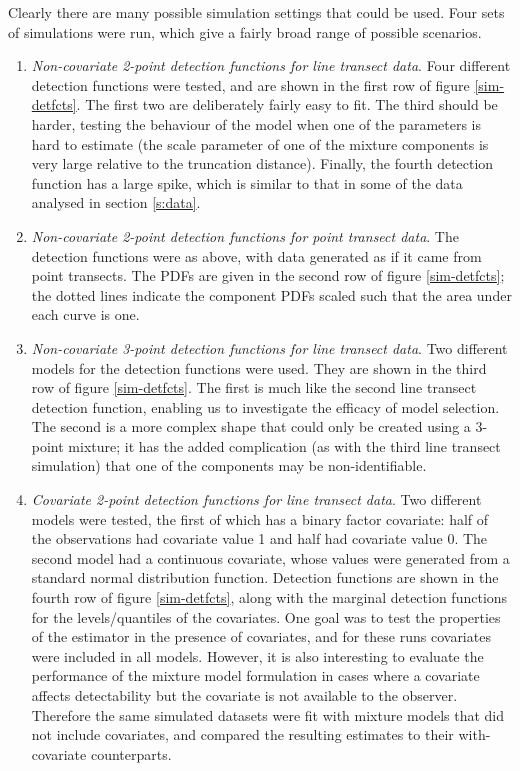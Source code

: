 Clearly there are many possible simulation settings that could be used. Four sets of simulations were run, which give a fairly broad range of possible scenarios.
\begin{enumerate}
	\item \textit{Non-covariate 2-point detection functions for line transect data}. Four different detection functions were tested, and are shown in the first row of figure \ref{sim-detfcts}. The first two are deliberately fairly easy to fit. The third should be harder, testing the behaviour of the model when one of the parameters is hard to estimate (the scale parameter of one of the mixture components is very large relative to the truncation distance). Finally, the fourth detection function has a large spike, which is similar to that in some of the data analysed in section \ref{s:data}.
	\item \textit{Non-covariate 2-point detection functions for point transect data}.  The detection functions were as above, with data generated as if it came from point transects. The PDFs are given in the second row of figure \ref{sim-detfcts}; the dotted lines indicate the component PDFs scaled such that the area under each curve is one.
	\item \textit{Non-covariate 3-point detection functions for line transect data}. Two different models for the detection functions were used. They are shown in the third row of figure \ref{sim-detfcts}. The first is much like the second line transect detection function, enabling us to investigate the efficacy of model selection. The second is a more complex shape that could only be created using a 3-point mixture; it has the added complication (as with the third line transect simulation) that one of the components may be non-identifiable.
	\item \textit{Covariate 2-point detection functions for line transect data}. Two different models were tested, the first of which has a binary factor covariate: half of the observations had covariate value 1 and half had covariate value 0. The second model had a continuous covariate, whose values were generated from a standard normal distribution function. Detection functions are shown in the fourth row of figure \ref{sim-detfcts}, along with the marginal detection functions for the levels/quantiles of the covariates. One goal was to test the properties of the estimator in the presence of covariates, and for these runs covariates were included in all models.  However, it is also interesting to evaluate the performance of the mixture model formulation in cases where a covariate affects detectability but the covariate is not available to the observer. Therefore the same simulated datasets were fit with mixture models that did not include covariates, and compared the resulting estimates to their with-covariate counterparts.
\end{enumerate}

